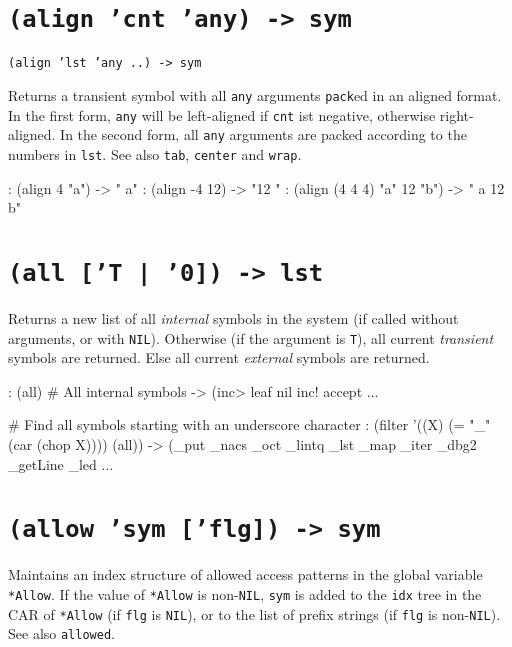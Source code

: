  
\section*{\texttt{(align 'cnt 'any) -> sym}}
\label{sec:func-ref-A-(align 'cnt 'any) -> sym}


\texttt{(align 'lst 'any ..) -> sym}

Returns a transient symbol with all \texttt{any} arguments \texttt{pack}ed in an aligned format. In the first form, \texttt{any} will be left-aligned if \texttt{cnt}
ist negative, otherwise right-aligned. In the second form, all \texttt{any}
arguments are packed according to the numbers in \texttt{lst}. See also \texttt{tab},
\texttt{center} and \texttt{wrap}.


\begin{wideverbatim}
: (align 4 "a")
-> "   a"
: (align -4 12)
-> "12  "
: (align (4 4 4) "a" 12 "b")
-> "   a  12   b"
\end{wideverbatim}

 
\section*{\texttt{(all ['T | '0]) -> lst}}
\label{sec:func-ref-A-(all ['T | '0]) -> lst}


Returns a new list of all \emph{internal} symbols in the
system (if called without arguments, or with \texttt{NIL}). Otherwise (if the
argument is \texttt{T}), all current \emph{transient} symbols
are returned. Else all current \emph{external} symbols
are returned.


\begin{wideverbatim}
: (all)  # All internal symbols
-> (inc> leaf nil inc! accept ...

# Find all symbols starting with an underscore character
: (filter '((X) (= "_" (car (chop X)))) (all))
-> (_put _nacs _oct _lintq _lst _map _iter _dbg2 _getLine _led ...
\end{wideverbatim}

 
\section*{\texttt{(allow 'sym ['flg]) -> sym}}
\label{sec:func-ref-A-(allow 'sym ['flg]) -> sym}


Maintains an index structure of allowed access patterns in the global
variable \texttt{*Allow}. If the value of \texttt{*Allow} is non-\texttt{NIL}, \texttt{sym} is added
to the \texttt{idx} tree in the CAR of \texttt{*Allow} (if \texttt{flg} is \texttt{NIL}), or to the
list of prefix strings (if \texttt{flg} is non-\texttt{NIL}). See also \texttt{allowed}.


